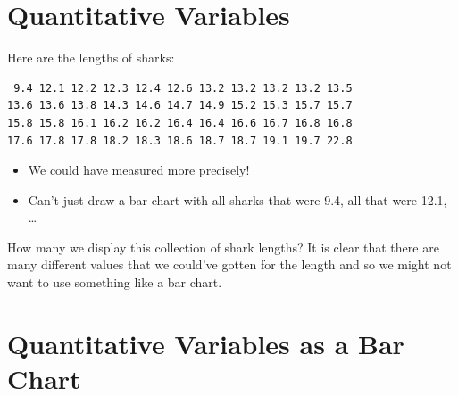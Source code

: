 \documentclass[
  letterpaper,
  DIV=11,
  numbers=noendperiod]{scrreprt}
\providecommand{\tightlist}{%
  \setlength{\itemsep}{0pt}\setlength{\parskip}{0pt}}\usepackage{longtable,booktabs,array}
\begin{document}
\hypertarget{quantitative-variables}{%
\section{Quantitative Variables}\label{quantitative-variables}}

Here are the lengths of sharks:

\begin{verbatim}
 9.4 12.1 12.2 12.3 12.4 12.6 13.2 13.2 13.2 13.2 13.5
13.6 13.6 13.8 14.3 14.6 14.7 14.9 15.2 15.3 15.7 15.7
15.8 15.8 16.1 16.2 16.2 16.4 16.4 16.6 16.7 16.8 16.8
17.6 17.8 17.8 18.2 18.3 18.6 18.7 18.7 19.1 19.7 22.8
\end{verbatim}

\pspace

\begin{itemize}
\tightlist
\item
  We could have measured more precisely!\lspace
\item
  Can't just draw a bar chart with all sharks that were 9.4, all that
  were 12.1, \ldots{}\lspace
\end{itemize}

How many we display this collection of shark lengths? It is clear that
there are many different values that we could've gotten for the length
and so we might not want to use something like a bar chart.

\hypertarget{quantitative-variables-as-a-bar-chart}{%
\section{Quantitative Variables as a Bar
Chart}\label{quantitative-variables-as-a-bar-chart}}
\end{document}
